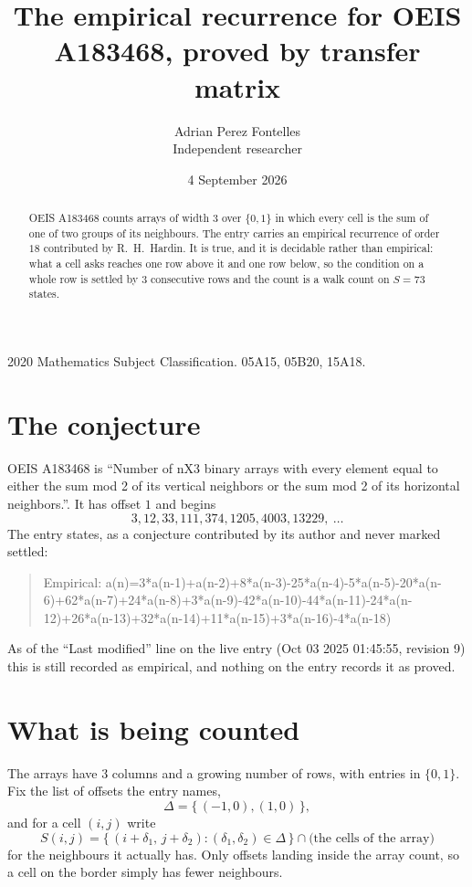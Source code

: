 \documentclass[11pt,a4paper]{article}
\title{The empirical recurrence for OEIS A183468, proved by transfer matrix}
\author{Adrian Perez Fontelles\\ \small Independent researcher}
\date{4 September 2026}
\theoremstyle{plain}
\theoremstyle{definition}
\begin{document}
\maketitle

\begin{abstract}
OEIS A183468 counts arrays of width $3$ over $\{0,1\}$ in which every cell is the sum of one of two groups of its neighbours. The entry carries an
empirical recurrence of order $18$ contributed by R.~H.~Hardin. It is true, and it is
decidable rather than empirical: what a cell asks reaches one row above
it and one row below, so the condition on a whole row is settled by
$3$ consecutive rows and the count is a walk count on $S=73$ states.
\end{abstract}

\noindent\small 2020 Mathematics Subject Classification. 05A15, 05B20, 15A18.\normalsize

\section{The conjecture}

OEIS A183468 is ``Number of nX3 binary arrays with every element equal to either the sum mod 2 of its vertical neighbors or the sum mod 2 of its horizontal neighbors.''. It has offset $1$ and begins
\[
3, 12, 33, 111, 374, 1205, 4003, 13229,\ \dots
\]
The entry states, as a conjecture contributed by its author and never marked settled:
\begin{quote}
Empirical: a(n)=3*a(n-1)+a(n-2)+8*a(n-3)-25*a(n-4)-5*a(n-5)-20*a(n-6)+62*a(n-7)+24*a(n-8)+3*a(n-9)-42*a(n-10)-44*a(n-11)-24*a(n-12)+26*a(n-13)+32*a(n-14)+11*a(n-15)+3*a(n-16)-4*a(n-18)
\end{quote}
As of the ``Last modified'' line on the live entry (Oct 03 2025 01:45:55, revision 9) this is still
recorded as empirical, and nothing on the entry records it as proved.

\section{What is being counted}

The arrays have $3$ columns and a growing number of rows, with entries in $\{0,1\}$. Fix the
list of offsets the entry names,
\[
\Delta=\{\,(-1,0), (1,0)\,\},
\]
and for a cell $(i,j)$ write
\[
S(i,j)=\{\,(i+\delta_1,\,j+\delta_2) : (\delta_1,\delta_2)\in\Delta\,\}\cap
\text{(the cells of the array)}
\]
for the neighbours it actually has. Only offsets landing inside the array count, so a cell on
the border simply has fewer neighbours.
\end{document}
